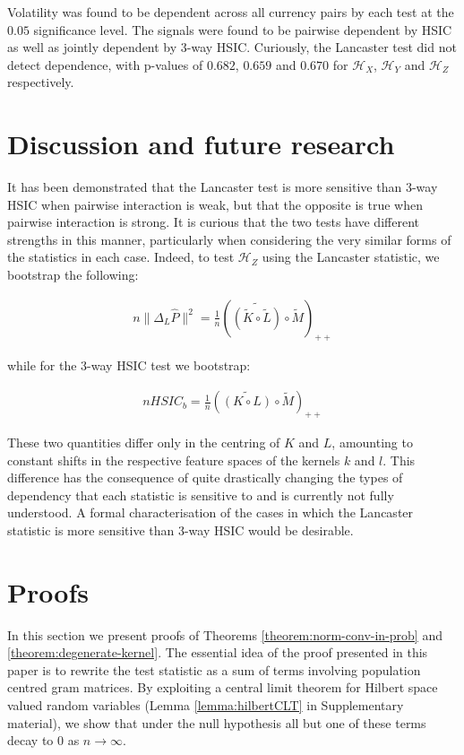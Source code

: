 \documentclass[]{article}
\begin{document}
Volatility was found to be dependent across all currency pairs by each test at the $0.05$ significance level. The signals were found to be pairwise dependent by HSIC as well as jointly dependent by 3-way HSIC. Curiously, the Lancaster test did not detect dependence, with p-values of $0.682$, $0.659$ and $0.670$ for $\mathcal{H}_X$, $\mathcal{H}_Y$ and $\mathcal{H}_Z$ respectively.


\section{Discussion and future research}

It has been demonstrated that the Lancaster test is more sensitive than 3-way HSIC when pairwise interaction is weak, but that the opposite is true when pairwise interaction is strong. It is curious that the two tests have different strengths in this manner, particularly when considering the very similar forms of the statistics in each case. Indeed, to test $\mathcal{H}_Z$ using the Lancaster statistic, we bootstrap the following:

\begin{align*}
n\|\Delta_L\hat{P}\|^2 = \frac{1}{n}\left(\widetilde{\left( \tilde{K} \circ \tilde{L}\right) }\circ \tilde{M} \right)_{++}
\end{align*}

while for the 3-way HSIC test we bootstrap:

\begin{align*}
nHSIC_b = \frac{1}{n}\left(\widetilde{\left( K \circ L\right) }\circ \tilde{M} \right)_{++}
\end{align*}

These two quantities differ only in the centring of $K$ and $L$, amounting to constant shifts in the respective feature spaces of the kernels $k$ and $l$. This difference has the consequence of quite drastically changing the types of dependency that each statistic is sensitive to and is currently not fully understood. A formal characterisation of the cases in which the Lancaster statistic is more sensitive than 3-way HSIC would be desirable.


\section{Proofs}

In this section we present proofs of Theorems \ref{theorem:norm-conv-in-prob} and \ref{theorem:degenerate-kernel}. The essential idea of the proof presented in this paper is to rewrite the test statistic as a sum of terms involving population centred gram matrices. By exploiting a central limit theorem for Hilbert space valued random variables (Lemma \ref{lemma:hilbertCLT} in Supplementary material), we show that under the null hypothesis all but one of these terms decay to $0$ as $n \longrightarrow \infty$. 
\end{document}

